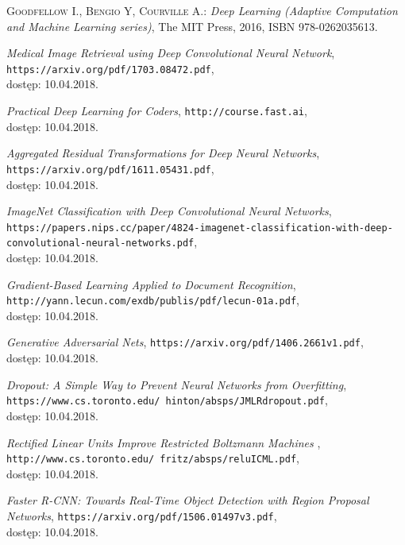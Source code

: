 \documentclass[a4paper,twoside,titlepage,openright]{book}
\begin{document}
\begin{thebibliography}{99}

 \textsc{Goodfellow I., Bengio Y, Courville A.:}
\textit{Deep Learning (Adaptive Computation and Machine Learning series)}, The MIT Press, 2016, ISBN 978-0262035613.

 \textit{Medical Image Retrieval using Deep Convolutional Neural Network}, 
\texttt{https://arxiv.org/pdf/1703.08472.pdf}, \\dostęp: 10.04.2018.

 \textit{Practical Deep Learning for Coders}, 
\texttt{http://course.fast.ai}, \\dostęp: 10.04.2018.

 \textit{Aggregated Residual Transformations for Deep Neural Networks}, 
\texttt{https://arxiv.org/pdf/1611.05431.pdf}, \\dostęp: 10.04.2018.

 \textit{ImageNet Classification with Deep Convolutional Neural Networks}, 
\texttt{https://papers.nips.cc/paper/4824-imagenet-classification-with-deep-convolutional-neural-networks.pdf}, \\dostęp: 10.04.2018.

 \textit{Gradient-Based Learning Applied to Document Recognition}, 
\texttt{http://yann.lecun.com/exdb/publis/pdf/lecun-01a.pdf}, \\dostęp: 10.04.2018.

 \textit{Generative Adversarial Nets}, 
\texttt{https://arxiv.org/pdf/1406.2661v1.pdf}, \\dostęp: 10.04.2018.

 \textit{Dropout: A Simple Way to Prevent Neural Networks from Overfitting}, 
\texttt{https://www.cs.toronto.edu/~hinton/absps/JMLRdropout.pdf}, \\dostęp: 10.04.2018.

 \textit{Rectified Linear Units Improve Restricted Boltzmann Machines
}, 
\texttt{http://www.cs.toronto.edu/~fritz/absps/reluICML.pdf}, \\dostęp: 10.04.2018.

 \textit{Faster R-CNN: Towards Real-Time Object Detection with Region Proposal Networks}, 
\texttt{https://arxiv.org/pdf/1506.01497v3.pdf}, \\dostęp: 10.04.2018.


\end{thebibliography}
\end{document}
